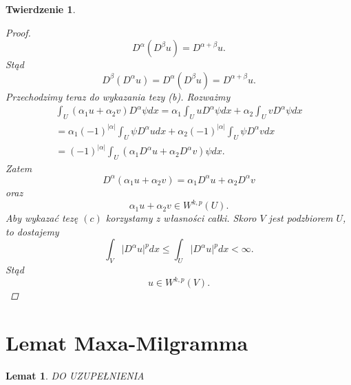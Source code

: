 \documentclass[12pt,a4paper,oneside,titlepage]{article}
\newtheorem{Twierdzenie}{Twierdzenie}
\newtheorem{Lemat}{Lemat}
\begin{document}
\begin{Twierdzenie}
\begin{proof}
\begin{equation}
\nonumber
D^{\alpha} \left( D^{\beta} u \right) = D^{\alpha+\beta}u .
\end{equation}
Stąd
\begin{equation}
\nonumber
D^{\beta} \left( D^{\alpha} u \right) = D^{\alpha} \left( D^{\beta} u \right) = D^{\alpha+\beta}u .
\end{equation}
Przechodzimy teraz do wykazania tezy (b). Rozważmy
\begin{equation}
\nonumber
\begin{split}
\int_{U} \left( \alpha_1 u + \alpha_2 v \right) D^{\alpha}\psi dx = \alpha_1 \int_{U} u D^{\alpha} \psi dx + \alpha_2 \int_{U}  v D^{\alpha} \psi dx \\ = \alpha_1 (-1)^{\vert \alpha \vert} \int_{U} \psi D^{\alpha} u  dx + \alpha_2 (-1)^{\vert \alpha \vert} \int_{U} \psi D^{\alpha} v  dx \\ =  (-1)^{\vert \alpha \vert} \int_{U} \left( \alpha_1 D^{\alpha} u + \alpha_2 D^{\alpha} v \right) \psi dx .
\end{split}
\end{equation}
Zatem
\begin{equation}
\nonumber
D^{\alpha}(\alpha_1 u + \alpha_2 v) = \alpha_1 D^{\alpha}u + \alpha_2 D^{\alpha} v 
\end{equation}
oraz
\begin{equation}
\nonumber
\alpha_1 u +\alpha_2 v \in W^{k,p}(U) .
\end{equation}
Aby wykazać tezę $(c)$ korzystamy z własności całki. Skoro $V$ jest podzbiorem $U$, to dostajemy
\begin{equation}
\nonumber
\int_{V} \vert D^{\alpha} u \vert^{p} dx \leq \int_{U} \vert D^{\alpha} u \vert^{p} dx < \infty .
\end{equation}
Stąd
\begin{equation}
\nonumber
u \in W^{k,p}(V) .
\end{equation}
\end{proof}
\end{Twierdzenie}
\newpage
\section{Lemat Maxa-Milgramma}
\begin{Lemat} DO UZUPEŁNIENIA
\end{Lemat}
\end{document}
